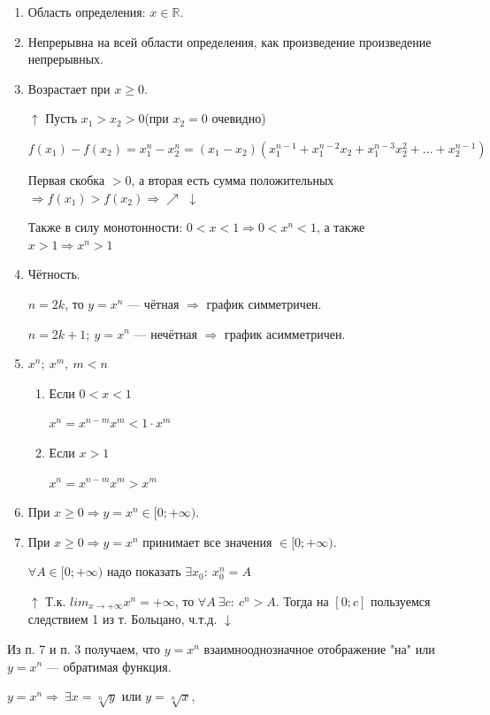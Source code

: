 \documentclass{article}
\begin{document}
    \begin{enumerate}
        \item Область определения: \( x \in \mathbb{R}\).
        \item Непрерывна на всей области определения, как произведение произведение непрерывных.
        \item Возрастает при \(x \geq 0\).
        
        \(\uparrow\) Пусть \(x_1 > x_2 > 0\)(при \(x_2=0\) очевидно)

        \( f(x_1) - f(x_2) = x_1^n - x_2^n = (x_1 - x_2)(x_1^{n - 1} + x_1^{n - 2}x_2 + x_1^{n - 3}x_2^2 + ... + x_2^{n - 1}) \) 

        Первая скобка \( > 0 \), а вторая есть сумма положительных \( \Rightarrow f(x_1) > f(x_2) \Rightarrow \nearrow\) \(\downarrow\)
        
        Также в силу монотонности: \( 0 < x < 1 \Rightarrow 0 < x^n < 1 \), а также \(x > 1 \Rightarrow x^n > 1\)

        \item Чётность.
        
        \( n = 2k \), то \( y = x^n \) --- чётная \( \Rightarrow \) график симметричен.
        
        \(n = 2k + 1;\ y = x^n\) --- нечётная \(\Rightarrow\) график асимметричен.
        
        \item \(x^n;\ x^m,\ m < n\)

        \begin{enumerate}
            \item Если \(0 < x < 1\)

            \(x^n = x^{n-m}x^m < 1 \cdot x^m\)

            \item Если \(x > 1\)

            \(x^n = x^{n-m}x^m > x^m\)
        \end{enumerate}
    
        \item При \( x \geq 0 \Rightarrow y = x^n \in [0; +\infty) \).
        \item При \( x \geq 0 \Rightarrow y = x^n \) принимает все значения \( \in [0; +\infty) \).

        \(\forall A \in [0; +\infty)\) надо показать \(\exists x_0:\ x_0^n = A\)

        \(\uparrow\) Т.к. \(lim_{x \rightarrow +\infty} x^n = +\infty\), то \(\forall A\ \exists c:\ c^n > A\). Тогда на \([0; c]\) пользуемся следствием 1 из т. Больцано, ч.т.д. \(\downarrow\)
        
    \end{enumerate}

    Из п. 7 и п. 3 получаем, что \( y = x^n \) взаимнооднозначное отображение "на" или \( y = x^n \) --- обратимая функция.

    \( y = x^n \Rightarrow\ \exists x = \sqrt[n]{y} \) или \( y = \sqrt[n]{x} \),
    
\end{document}
